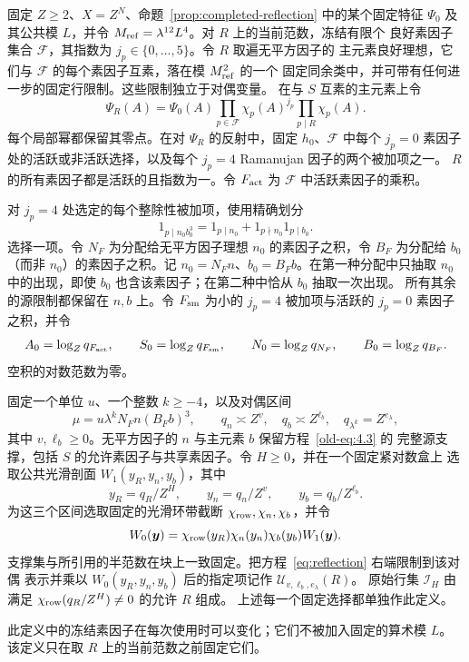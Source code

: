 \begin{definition}[无标记反射块]
\label{def:unmarked-reflected-block}
固定 $Z\ge2$、$X=Z^N$、命题~\ref{prop:completed-reflection} 中的某个固定特征 $\Psi_0$
及其公共模 $L$，并令 $M_{\rm ref}=\lambda^{12}L^4$。对 $R$ 上的当前范数，冻结有限个
良好素因子集合 $\mathcal F$，其指数为 $j_p\in\{0,\ldots,5\}$。令 $R$ 取遍无平方因子的
主元素良好理想，它们与 $\mathcal F$ 的每个素因子互素，落在模 $M_{\rm ref}^2$ 的一个
固定同余类中，并可带有任何进一步的固定行限制。这些限制独立于对偶变量。
在与 $S$ 互素的主元素上令
\[
 \Psi_R(A)=\Psi_0(A)\prod_{p\in\mathcal F}\chi_p(A)^{j_p}
                         \prod_{p\mid R}\chi_p(A).
\]
每个局部幂都保留其零点。在对 $\Psi_R$ 的反射中，固定 $h_0$、$\mathcal F$ 中每个
$j_p=0$ 素因子处的活跃或非活跃选择，以及每个 $j_p=4$ Ramanujan 因子的两个被加项之一。
$R$ 的所有素因子都是活跃的且指数为一。令 $F_{\rm act}$ 为 $\mathcal F$ 中活跃素因子的乘积。

对 $j_p=4$ 处选定的每个整除性被加项，使用精确划分
\[
 1_{p\mid n_0b_0^3}=1_{p\mid n_0}+1_{p\nmid n_0}1_{p\mid b_0}.
\]
选择一项。令 $N_F$ 为分配给无平方因子理想 $n_0$ 的素因子之积，令 $B_F$ 为分配给
$b_0$（而非 $n_0$）的素因子之积。记 $n_0=N_Fn$、$b_0=B_Fb$。在第一种分配中只抽取
$n_0$ 中的出现，即使 $b_0$ 也含该素因子；在第二种中恰从 $b_0$ 抽取一次出现。
所有其余的源限制都保留在 $n,b$ 上。令 $F_{\rm sm}$ 为小的 $j_p=4$ 被加项与活跃的
$j_p=0$ 素因子之积，并令
\[
 A_0=\log_Zq_{F_{\rm act}},\qquad S_0=\log_Zq_{F_{\rm sm}},\qquad
 N_0=\log_Zq_{N_F},\qquad B_0=\log_Zq_{B_F}.
\]
空积的对数范数为零。

固定一个单位 $u$、一个整数 $k\ge-4$，以及对偶区间
\[
 \mu=u\lambda^kN_Fn(B_Fb)^3,\qquad
 q_n\asymp Z^v,\quad q_b\asymp Z^{\ell_b},\quad
 q_{\lambda^k}=Z^{e_\lambda},
\]
其中 $v,\ell_b\ge0$。无平方因子的 $n$ 与主元素 $b$ 保留方程~\eqref{old-eq:4.3} 的
完整源支撑，包括 $S$ 的允许素因子与共享素因子。令 $H\ge0$，并在一个固定紧对数盒上
选取公共光滑剖面 $W_1(y_R,y_n,y_b)$，其中
\[
 y_R=q_R/Z^H,\qquad y_n=q_n/Z^v,\qquad y_b=q_b/Z^{\ell_b}.
\]
为这三个区间选取固定的光滑环带截断 $\chi_{\rm row},\chi_n,\chi_b$，并令
\[
 W_0(\boldsymbol y)=\chi_{\rm row}(y_R)\chi_n(y_n)\chi_b(y_b)W_1(\boldsymbol y).
\]
支撑集与所引用的半范数在块上一致固定。把方程~\eqref{eq:reflection} 右端限制到该对偶
表示并乘以 $W_0(y_R,y_n,y_b)$ 后的指定项记作 $\mathcal U_{v,\ell_b,e_\lambda}(R)$。
原始行集 $\mathcal I_H$ 由满足 $\chi_{\rm row}(q_R/Z^H)\ne0$ 的允许 $R$ 组成。
上述每一个固定选择都单独作此定义。
\end{definition}

此定义中的冻结素因子在每次使用时可以变化；它们不被加入固定的算术模 $L$。
该定义只在取 $R$ 上的当前范数之前固定它们。

